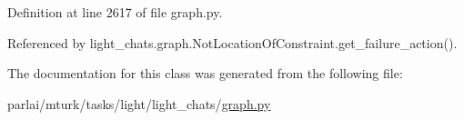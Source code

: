 Definition at line 2617 of file graph.\+py.



Referenced by light\+\_\+chats.\+graph.\+Not\+Location\+Of\+Constraint.\+get\+\_\+failure\+\_\+action().



The documentation for this class was generated from the following file\+:\begin{DoxyCompactItemize}
\item 
parlai/mturk/tasks/light/light\+\_\+chats/\hyperlink{parlai_2mturk_2tasks_2light_2light__chats_2graph_8py}{graph.\+py}\end{DoxyCompactItemize}
